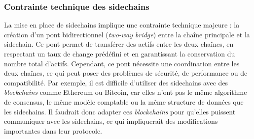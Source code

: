 \subsubsection{Contrainte technique des sidechains}
La mise en place de sidechains implique une contrainte technique majeure : la création d'un pont bidirectionnel (\textit{two-way bridge}) entre la chaîne 
principale et la sidechain. Ce pont permet de transférer des actifs entre les deux chaînes, en respectant un taux de change prédéfini et en garantissant la 
conservation du nombre total d'actifs. Cependant, ce pont nécessite une coordination entre les deux chaînes, ce qui peut poser des problèmes de sécurité, de 
performance ou de compatibilité. Par exemple, il est difficile d'utiliser des sidechains avec des \textit{blockchains} comme Ethereum ou Bitcoin, car elles n'ont 
pas le même algorithme de consensus, le même modèle comptable ou la même structure de données que les sidechains. Il faudrait donc adapter ces \textit{blockchains} 
pour qu'elles puissent communiquer avec les sidechains, ce qui impliquerait des modifications importantes dans leur protocole.
